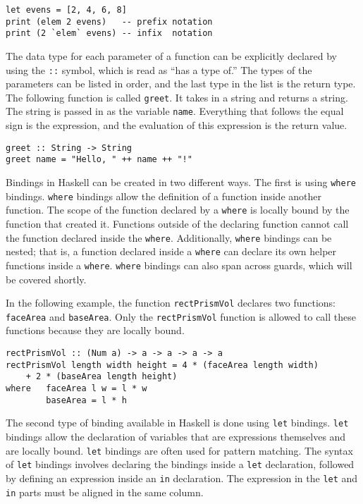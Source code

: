 \documentclass[titlepage,12pt]{article}
\begin{document}
\begin{verbatim}
let evens = [2, 4, 6, 8]
print (elem 2 evens)   -- prefix notation
print (2 `elem` evens) -- infix  notation
\end{verbatim}

The data type for each parameter of a function can be explicitly declared by using the \texttt{::} symbol, which is 
read as ``has a type of.''  The types of the parameters can be listed in order, and the last type in the list 
is the return type. The following function is called \texttt{greet}. It takes in a string and returns a string. The string is passed in as the variable \texttt{name}. Everything that follows the equal sign is the expression, and the evaluation of this expression is the return value. 

\begin{verbatim}
greet :: String -> String
greet name = "Hello, " ++ name ++ "!"
\end{verbatim}

Bindings in Haskell can be created in two different ways. The first is using \texttt{where} bindings. \texttt{where} bindings allow 
the definition of a function inside another function. The scope of the function declared by a \texttt{where} is locally bound 
by the function that created it. Functions outside of the declaring function cannot call the function declared inside 
the \texttt{where}. Additionally, \texttt{where} bindings can be nested; that is, a function declared inside a \texttt{where} can declare
its own helper functions inside a \texttt{where}. \texttt{where} bindings can also span across guards, which will be covered shortly. 

In the following example, the function \texttt{rectPrismVol} declares two functions: \texttt{faceArea} and \texttt{baseArea}. Only the 
\texttt{rectPrismVol} function is allowed to call these functions because they are locally bound. 

\begin{verbatim}
rectPrismVol :: (Num a) -> a -> a -> a -> a
rectPrismVol length width height = 4 * (faceArea length width)
    + 2 * (baseArea length height)
where   faceArea l w = l * w
        baseArea = l * h
\end{verbatim}

The second type of binding available in Haskell is done using \texttt{let} bindings. \texttt{let} bindings allow the declaration of 
variables that are expressions themselves and are locally bound.  \texttt{let} bindings are often used for pattern matching. 
The syntax of \texttt{let} bindings involves declaring the bindings inside a \texttt{let} declaration, followed by defining an 
expression inside an \texttt{in} declaration. The expression in the \texttt{let} and \texttt{in} parts must be aligned in the same column. 
\end{document}
